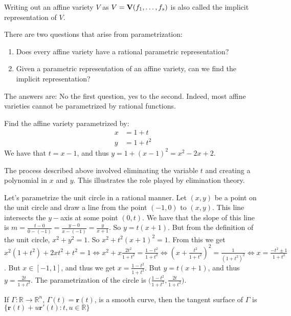 \documentclass[../main.tex]{subfiles}
\begin{document}
\begin{remark}
Writing out an affine variety $V$ as $V=\textbf{V}(f_1,\hdots, f_s)$ is also called the implicit representation of $V$.
\end{remark}
%
There are two questions that arise from parametrization:
%
\begin{enumerate}
\item Does every affine variety have a rational parametric representation?
\item Given a parametric representation of an affine variety, can we find the implicit representation?
\end{enumerate}
%
The answers are: No the first question, yes to the second. Indeed, most affine varieties cannot be parametrized by rational functions.
%
\begin{example}
Find the affine variety parametrized by:
\begin{align}
\nonumber x &= 1+t \\
\nonumber y &= 1+t^2
\end{align}
We have that $t = x-1$, and thus $y = 1+(x-1)^2 = x^2-2x+2$.
\end{example}
%
\begin{remark}
The process described above involved eliminating the variable $t$ and creating a polynomial in $x$ and $y$. This illustrates the role played by elimination theory.
\end{remark}
%
\begin{example}
Let's parametrize the unit circle in a rational manner. Let $(x,y)$ be a point on the unit circle and draw a line from the point $(-1,0)$ to $(x,y)$. This line intersects the $y-$axis at some point $(0,t)$. We have that the slope of this line is $m = \frac{t-0}{0-(-1)} = \frac{y-0}{x-(-1)} = \frac{y}{x+1}$. So $y = t(x+1)$. But from the definition of the unit circle, $x^2+y^2=1$. So $x^2+t^2(x+1)^2 = 1$. From this we get $x^2(1+t^2)+2xt^2 + t^2 = 1 \Leftrightarrow x^2+x\frac{2t^2}{1+t^2} = \frac{1-t^2}{1+t^2} \Leftrightarrow (x+ \frac{t^2}{1+t^2})^2 = \frac{1 }{(1+t^2)^2}\Leftrightarrow x = \frac{-t^2 \pm 1}{1+t^2}$. But $x\in [-1,1]$, and thus we get $x = \frac{1-t^2}{1+t^2}$. But $y = t(x+1)$, and thus $y = \frac{2t}{1+t^2}$. The parametrization of the circle is $\big(\frac{1-t^2}{1+t^2},\frac{2t}{1+t^2}\big)$.
\end{example}
%
\begin{definition}
If $\Gamma:\mathbb{R}\rightarrow \mathbb{R}^n$, $\Gamma(t) = \mathbf{r}(t)$, is a smooth curve, then the tangent surface of $\Gamma$ is $\{\mathbf{r}(t)+u\mathbf{r}'(t):t,u\in \mathbb{R}\}$
\end{definition}
\end{document}
